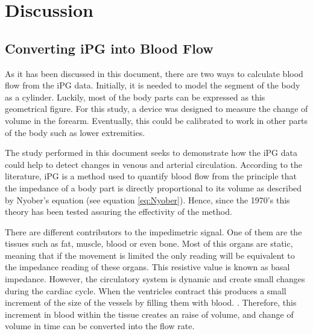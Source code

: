 
\chapter{Discussion}  %

\ifpdf
    \graphicspath{{Chapter7/Figs/Raster/}{Chapter7/Figs/PDF/}{Chapter7/Figs/}}
\else
    \graphicspath{{Chapter7/Figs/Vector/}{Chapter7/Figs/}}
\fi


\section{Converting iPG into Blood Flow} %
\label{section discussion 1}
As it has been discussed in this document, there are two ways to calculate blood flow from the iPG data. Initially, it is needed to model the segment of the body as a cylinder. Luckily, most of the body parts can be expressed as this geometrical figure. For this study, a device was designed to measure the change of volume in the forearm. Eventually, this could be calibrated to work in other parts of the body such as lower extremities. 

The study performed in this document seeks to demonstrate how the iPG data could help to detect changes in venous and arterial circulation. According to the literature, iPG is a method used to quantify blood flow from the principle that the impedance of a body part is directly proportional to its volume as described by Nyober's equation  (see equation \ref{eq:Nyober}).  Hence, since the 1970's this theory has been tested assuring the effectivity of the method. 

There are different contributors to the impedimetric signal. One of them are the tissues such as fat, muscle, blood or even bone. Most of this organs are static, meaning that if the movement is limited the only reading will be equivalent to the impedance reading of these organs. This resistive value is known as basal impedance.  However,  the circulatory system is dynamic and create small changes during the cardiac cycle.  When the ventricles contract this produces a small increment of the size of the vessels by filling them with blood. 
. Therefore, this increment in blood within the tissue creates an raise of volume, and change of volume in time can be converted into the flow rate.

